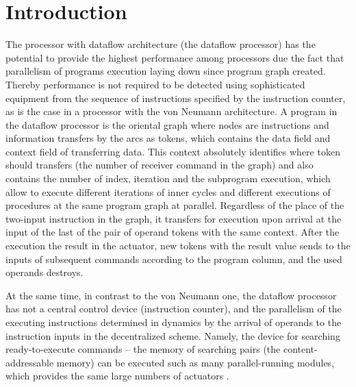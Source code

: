 \documentclass[
11pt,%
tightenlines,%
twoside,%
onecolumn,%
nofloats,%
nobibnotes,%
nofootinbib,%
superscriptaddress,%
noshowpacs,%
centertags]%
{revtex4}
\begin{document}


\maketitle

\section{Introduction}

The processor with dataflow architecture (the dataflow processor) has the potential to provide the highest performance among processors due the fact that parallelism of programs execution laying down since program graph created. Thereby performance is not required to be detected using sophisticated equipment from the sequence of instructions specified by the instruction counter, as is the case in a processor with the von Neumann architecture. A program in the dataflow processor is the oriental graph where nodes are instructions and information transfers by the arcs as tokens, which contains the data field and context field of transferring data. This context absolutely identifies where token should transfers (the number of receiver command in the graph) and also contains the number of index, iteration and the subprogram execution, which allow to execute different iterations of inner cycles and different executions of procedures at the same program graph at parallel. Regardless of the place of the two-input instruction in the graph, it transfers for execution upon arrival at the input of the last of the pair of operand tokens with the same context. After the execution the result in the actuator, new tokens with the result value sends to the inputs of subsequent commands according to the program column, and the used operands destroys.

At the same time, in contrast to the von Neumann one, the dataflow processor has not a central control device (instruction counter), and the parallelism of the executing instructions determined in dynamics by the arrival of operands to the instruction inputs in the decentralized scheme. Namely, the device for searching ready-to-execute commands -- the memory of searching pairs (the content-addressable memory) can be executed such as many parallel-running modules, which provides the same large numbers of actuators \cite{fine-grained-prl}.
\end{document}
